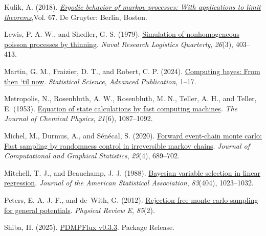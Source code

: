 \documentclass[
]{article}
\newlength{\cslhangindent}
\newenvironment{CSLReferences}[2] %
 {\begin{list}{}{%
  \setlength{\itemindent}{0pt}
  \setlength{\leftmargin}{0pt}
  \setlength{\parsep}{0pt}
  \ifodd #1
   \setlength{\leftmargin}{\cslhangindent}
   \setlength{\itemindent}{-1\cslhangindent}
  \fi
  \setlength{\itemsep}{#2\baselineskip}}}
 {\end{list}}
\theoremstyle{StatementsWithUnderline}\newtheorem{theorem}{定理}[section]\newtheorem{definition}[theorem]{定義}\newtheorem{corollary}[theorem]{系}\newtheorem{proposition}[theorem]{命題}\newtheorem{lemma}[theorem]{補題}\newtheorem{example}[theorem]{例}
\theoremstyle{definition}\newtheorem{notation}[theorem]{記法}\newtheorem{algorithm}[theorem]{算譜}\newtheorem{remarks}[theorem]{要諦}\newtheorem{remark}[theorem]{注}
\begin{document}
\begin{CSLReferences}{1}{1}
Kulik, A. (2018).
\emph{\href{https://doi.org/10.1515/9783110458930}{Ergodic behavior of
markov processes: With applications to limit theorems}},Vol. 67. De
Gruyter: Berlin, Boston.

Lewis, P. A. W., and Shedler, G. S. (1979).
\href{https://doi.org/10.1002/nav.3800260304}{Simulation of
nonhomogeneous poisson processes by thinning}. \emph{Naval Research
Logistics Quarterly}, \emph{26}(3), 403--413.

Martin, G. M., Fraizier, D. T., and Robert, C. P. (2024).
\href{https://projecteuclid.org/journals/statistical-science/volume-39/issue-1/Computing-Bayes-From-Then-Til-Now/10.1214/22-STS876.short}{Computing
bayes: From then `til now}. \emph{Statistical Science}, \emph{Advanced
Publication}, 1--17.

Metropolis, N., Rosenbluth, A. W., Rosenbluth, M. N., Teller, A. H., and
Teller, E. (1953). \href{https://doi.org/10.1063/1.1699114}{Equation of
state calculations by fast computing machines}. \emph{The Journal of
Chemical Physics}, \emph{21}(6), 1087--1092.

Michel, M., Durmus, A., and Sénécal, S. (2020).
\href{https://doi.org/10.1080/10618600.2020.1750417}{Forward event-chain
monte carlo: Fast sampling by randomness control in irreversible markov
chains}. \emph{Journal of Computational and Graphical Statistics},
\emph{29}(4), 689--702.

Mitchell, T. J., and Beauchamp, J. J. (1988).
\href{http://www.jstor.org/stable/2290129}{Bayesian variable selection
in linear regression}. \emph{Journal of the American Statistical
Association}, \emph{83}(404), 1023--1032.

Peters, E. A. J. F., and de~With, G. (2012).
\href{https://journals.aps.org/pre/abstract/10.1103/PhysRevE.85.026703}{Rejection-free
monte carlo sampling for general potentials}. \emph{Physical Review E},
\emph{85}(2).

Shiba, H. (2025).
\href{https://doi.org/10.5281/zenodo.14792019}{PDMPFlux v0.3.3}. Package
Release.

\end{CSLReferences}
\end{document}
